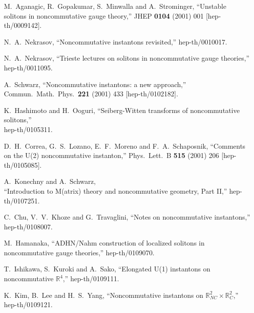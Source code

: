 \documentclass[a4paper,11pt]{article}
\numberwithin{equation}{section}
\newcommand{\R}{\mathbb R}
\begin{document}
{\begin{thebibliography}{99}
M.~Aganagic, R.~Gopakumar, S.~Minwalla and A.~Strominger,
``Unstable solitons in noncommutative gauge theory,''
JHEP {\bf 0104} (2001) 001
[hep-th/0009142].

N.~A.~Nekrasov,
``Noncommutative instantons revisited,''
hep-th/0010017.

N.~A.~Nekrasov,
``Trieste lectures on solitons in noncommutative gauge theories,''\\
hep-th/0011095.

A.~Schwarz,
``Noncommutative instantons: a new approach,''\\
Commun.\ Math.\ Phys.\  {\bf 221} (2001) 433
[hep-th/0102182].

K.~Hashimoto and H.~Ooguri,
``Seiberg-Witten transforms of noncommutative solitons,''\\
hep-th/0105311.

D.~H.~Correa, G.~S.~Lozano, E.~F.~Moreno and F.~A.~Schaposnik,
``Comments on the U(2) noncommutative instanton,''
Phys.\ Lett.\ B {\bf 515} (2001) 206
[hep-th/0105085].

A.~Konechny and A.~Schwarz,\\
``Introduction to M(atrix) theory and noncommutative geometry, Part II,''
hep-th/0107251.

C.~Chu, V.~V.~Khoze and G.~Travaglini,
``Notes on noncommutative instantons,''\\
hep-th/0108007.

M.~Hamanaka,
``ADHN/Nahm construction of localized solitons in 
  noncommutative gauge theories,''
hep-th/0109070.

T.~Ishikawa, S.~Kuroki and A.~Sako,
``Elongated U(1) instantons on noncommutative $\R^4$,''
hep-th/0109111.

K.~Kim, B.~Lee and H.~S.~Yang,
``Noncommutative instantons on $\R^2_{NC} \times \R^2_C$,''
hep-th/0109121.


\end{thebibliography}}
\end{document}
